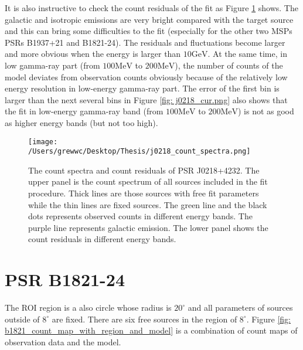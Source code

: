 \documentclass[12pt]{report}
\newcommand{\Notice}[1]{
  $<$\textbf{Notice}$>$#1$<$\textbf{/Notice}$>$
}
\begin{document}

            It is also instructive to check the count residuals of the fit as Figure 
            \ref{fig: j0218_count_spectra} shows. The galactic and isotropic emissions are very 
            bright compared with the target source and this can bring some difficulties to 
            the fit (especially for the other two MSPs PSRs B1937+21 and B1821-24). The residuals 
            and fluctuations become larger and more obvious when the energy is larger than 
            $10\mbox{GeV}$. At the same time, in low gamma-ray part 
            (from $100\mbox{MeV}$ to $200\mbox{MeV}$), the number of counts of the model 
            deviates from observation counts obviously because of the relatively low energy 
            resolution in low-energy gamma-ray part. The error of the first bin is larger
            than the next several bins in Figure \ref{fig: j0218_cur.png} also shows that 
            the fit in low-energy gamma-ray band (from $100\mbox{MeV}$ to $200\mbox{MeV}$) 
            is not as good as higher energy bands (but not too high). 
            
            \begin{figure}[!htp]
              \centering
              \texttt{[image: /Users/grewwc/Desktop/Thesis/j0218\_count\_spectra.png]}
              \caption{The count spectra and count residuals of PSR J0218+4232.
                      The upper panel is the count spectrum of all sources included in the 
                      fit procedure. Thick lines are those sources with free fit parameters 
                      while the thin lines are fixed sources. The green line and the black 
                      dots represents observed counts in different energy bands. The purple 
                      line represents galactic emission. The lower panel shows the count 
                      residuals in different energy bands. } 
              \label{fig: j0218_count_spectra}
            \end{figure}

            \section{PSR B1821-24}
              The ROI region is a also circle whose radius is $20^\circ$ and all 
              parameters of sources outside of $8^\circ$ are fixed. 
              There are six free sources in the region of $8^\circ$. Figure
              \ref{fig: b1821_count_map_with_region_and_model} 
              is a combination of count maps of observation data and the model. 
\end{document}
